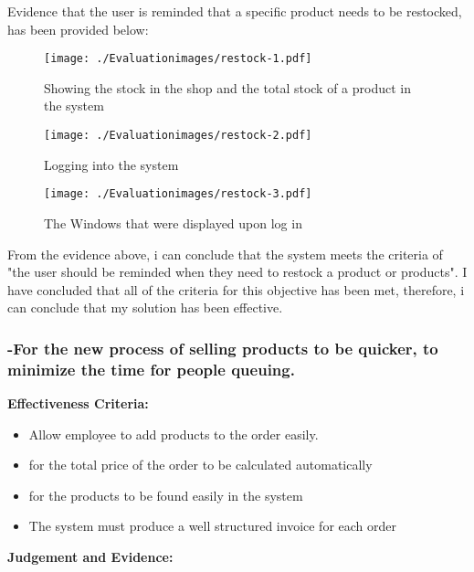 Evidence that the user is reminded that a specific product needs to be restocked, has been provided below:

\begin{figure}[H]
\caption{Showing the stock in the shop and the total stock of a product in the system}
\hfill\texttt{[image: ./Evaluationimages/restock-1.pdf]}
\end{figure}

\begin{figure}[H]
\caption{Logging into the system}
\hfill\texttt{[image: ./Evaluationimages/restock-2.pdf]}
\end{figure}

\begin{figure}[H]
\caption{The Windows that were displayed upon log in}
\hfill\texttt{[image: ./Evaluationimages/restock-3.pdf]}
\end{figure}

From the evidence above, i can conclude that the system meets the criteria of "the user should be reminded when they need to restock a product or products". I have concluded that all of the criteria for this objective has been met, therefore, i can conclude that my solution has been effective.










\pagebreak
\subsubsection{-For the new process of selling products to be quicker, to minimize the time for people queuing.}

\textbf{Effectiveness Criteria:}\newline
\begin{itemize}
	\item{Allow employee to add products to the order easily.}
	\item{for the total price of the order to be calculated automatically}
	\item{for the products to be found easily in the system}
	\item{The system must produce a well structured invoice for each order}
\end{itemize}

\textbf{Judgement and Evidence:} \newline

